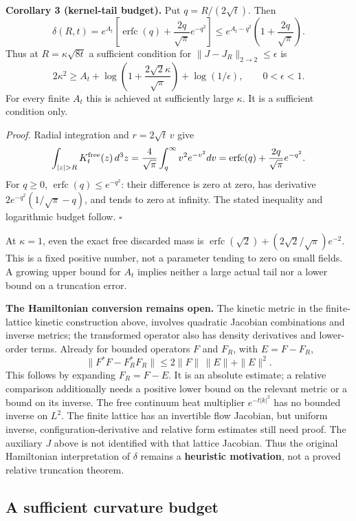 \documentclass[11pt,a4paper]{article}
\begin{document}
\textbf{Corollary 3 (kernel-tail budget).} Put \(q=R/(2\sqrt t)\). Then
\[\delta(R,t)=e^{A_t}
\left[\operatorname{erfc}(q)+\frac{2q}{\sqrt\pi}e^{-q^2}\right]
\le e^{A_t-q^2}\left(1+\frac{2q}{\sqrt\pi}\right).\] Thus at
\(R=\kappa\sqrt{8t}\) a sufficient condition for
\(\|J-J_R\|_{2\to2}\le\epsilon\) is \[2\kappa^2\ge A_t+
\log\left(1+\frac{2\sqrt2\kappa}{\sqrt\pi}\right)
+\log(1/\epsilon),\qquad 0<\epsilon<1.\] For every finite \(A_t\) this
is achieved at sufficiently large \(\kappa\). It is a sufficient
condition only.

\emph{Proof.} Radial integration and \(r=2\sqrt t\,v\) give
\[\int_{|z|>R}K_t^{\rm free}(z)\,d^3z
=\frac4{\sqrt\pi}\int_q^\infty v^2e^{-v^2}dv
=\operatorname{erfc}(q)+\frac{2q}{\sqrt\pi}e^{-q^2}.\] For \(q\ge0\),
\(\operatorname{erfc}(q)\le e^{-q^2}\): their difference is zero at
zero, has derivative \(2e^{-q^2}(1/\sqrt\pi-q)\), and tends to zero at
infinity. The stated inequality and logarithmic budget follow.
\(\square\)

At \(\kappa=1\), even the exact free discarded mass is
\(\operatorname{erfc}(\sqrt2)+(2\sqrt2/\sqrt\pi)e^{-2}\). This is a
fixed positive number, not a parameter tending to zero on small fields.
A growing upper bound for \(A_t\) implies neither a large actual tail
nor a lower bound on a truncation error.

\textbf{The Hamiltonian conversion remains open.} The kinetic metric in
the finite-lattice kinetic construction above, involves quadratic
Jacobian combinations and inverse metrics; the transformed operator also
has density derivatives and lower-order terms. Already for bounded
operators \(F\) and \(F_R\), with \(E=F-F_R\), \[\|F^*F-F_R^*F_R\|
\le2\|F\|\,\|E\|+\|E\|^2.\] This follows by expanding \(F_R=F-E\). It is
an absolute estimate; a relative comparison additionally needs a
positive lower bound on the relevant metric or a bound on its inverse.
The free continuum heat multiplier \(e^{-t|k|^2}\) has no bounded
inverse on \(L^2\). The finite lattice has an invertible flow Jacobian,
but uniform inverse, configuration-derivative and relative form
estimates still need proof. The auxiliary \(J\) above is not identified
with that lattice Jacobian. Thus the original Hamiltonian interpretation
of \(\delta\) remains a \textbf{heuristic motivation}, not a proved
relative truncation theorem.

\hypertarget{a-sufficient-curvature-budget}{%
\subsection{A sufficient curvature
budget}\label{a-sufficient-curvature-budget}}
\end{document}
